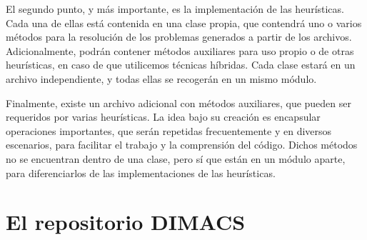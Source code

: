El segundo punto, y más importante, es la implementación de las heurísticas.
Cada una de ellas está contenida en una clase propia, que contendrá uno o varios
métodos para la resolución de los problemas generados a partir de los archivos.
Adicionalmente, podrán contener métodos auxiliares para uso propio o de otras
heurísticas, en caso de que utilicemos técnicas híbridas. Cada clase estará
en un archivo independiente, y todas ellas se recogerán en un mismo módulo.

Finalmente, existe un archivo adicional con métodos auxiliares, que pueden ser
requeridos por varias heurísticas. La idea bajo su creación es encapsular
operaciones importantes, que serán repetidas frecuentemente y en diversos
escenarios, para facilitar el trabajo y la comprensión del código. Dichos
métodos no se encuentran dentro de una clase, pero sí que están en un
módulo aparte, para diferenciarlos de las implementaciones de las heurísticas.


\section{El repositorio DIMACS}
